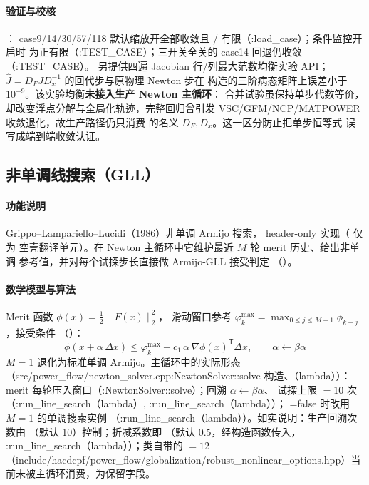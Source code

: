 \paragraph{验证与校核} ：
case9/14/30/57/118 默认缩放开全部收敛且 /
 有限（:load\_case）；条件监控开启时
 为正有限（:TEST\_CASE）；三开关全关的 case14 回退仍收敛
（:TEST\_CASE）。 另提供四遍 Jacobian
行/列最大范数均衡实验 API；$\hat J=D_FJD_x^{-1}$ 的回代步与原物理 Newton 步在
构造的三阶病态矩阵上误差小于 $10^{-9}$。该实验均衡\textbf{未接入生产 Newton 主循环}：
合并试验虽保持单步代数等价，却改变浮点分解与全局化轨迹，完整回归曾引发
VSC/GFM/NCP/MATPOWER 收敛退化，故生产路径仍只消费
 的名义 $D_F,D_x$。这一区分防止把单步恒等式
误写成端到端收敛认证。

\subsection{非单调线搜索（GLL）}\label{sec:robust:gll}

\paragraph{功能说明} Grippo--Lampariello--Lucidi（1986）非单调 Armijo 搜索，
header-only 实现（ 仅为
空壳翻译单元）。在 Newton 主循环中它维护最近 $M$ 轮 merit 历史、给出非单调
参考值，并对每个试探步长直接做 Armijo-GLL 接受判定
（）。
\paragraph{数学模型与算法} Merit 函数 $\phi(x)=\tfrac12\lVert F(x)\rVert_2^2$，
滑动窗口参考 $\varphi_k^{\max}=\max_{0\le j\le M-1}\phi_{k-j}$，接受条件
（）：
\[
\phi(x+\alpha\,\Delta x)\le \varphi_k^{\max}+c_1\,\alpha\,\nabla\phi(x)^{\mathsf T}\Delta x,
\qquad \alpha\leftarrow\beta\alpha
\]
$M=1$ 退化为标准单调 Armijo。主循环中的实际形态
（src/power\_flow/newton\_solver.cpp:NewtonSolver::solve 构造、（lambda））：
merit 每轮压入窗口（:NewtonSolver::solve）；回溯 $\alpha\leftarrow\beta\alpha$、
试探上限 $=10$ 次（:run\_line\_search（lambda）, :run\_line\_search（lambda））；
=false 时改用 $M=1$ 的单调搜索实例
（:run\_line\_search（lambda））。如实说明：生产回溯次数由 
（默认 10）控制；折减系数即 （默认 0.5，经构造函数传入，
:run\_line\_search（lambda））；类自带的 $=12$
（include/hacdcpf/power\_flow/globalization/robust\_nonlinear\_options.hpp）当前未被主循环消费，为保留字段。

